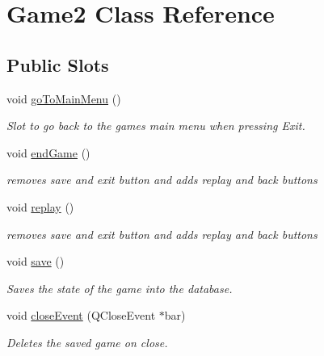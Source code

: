 \hypertarget{classGame2}{\section{\-Game2 \-Class \-Reference}
\label{classGame2}
}
\subsection*{\-Public \-Slots}
\begin{DoxyCompactItemize}
\item 
void \hyperlink{classGame2_a4703d041f8981d8e74b9970968b033d7}{go\-To\-Main\-Menu} ()
\begin{DoxyCompactList}\small\item\em \-Slot to go back to the games main menu when pressing \-Exit. \end{DoxyCompactList}\item 
void \hyperlink{classGame2_a38618590c202d5a3a8adc7aa7a770f0a}{end\-Game} ()
\begin{DoxyCompactList}\small\item\em removes save and exit button and adds replay and back buttons \end{DoxyCompactList}\item 
void \hyperlink{classGame2_a54ec031ce8f63c248862bfa9e2637bf6}{replay} ()
\begin{DoxyCompactList}\small\item\em removes save and exit button and adds replay and back buttons \end{DoxyCompactList}\item 
\hypertarget{classGame2_a8364cb2fe2c02cb0e3b93363672b24fe}{void \hyperlink{classGame2_a8364cb2fe2c02cb0e3b93363672b24fe}{save} ()}\label{classGame2_a8364cb2fe2c02cb0e3b93363672b24fe}

\begin{DoxyCompactList}\small\item\em \-Saves the state of the game into the database. \end{DoxyCompactList}\item 
void \hyperlink{classGame2_a57498c49c759e065615d43426d87137e}{close\-Event} (\-Q\-Close\-Event $\ast$bar)
\begin{DoxyCompactList}\small\item\em \-Deletes the saved game on close. \end{DoxyCompactList}\end{DoxyCompactItemize}
